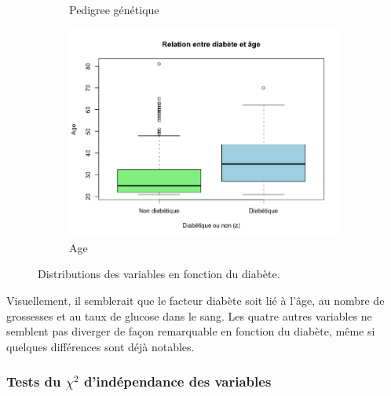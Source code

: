 \documentclass[a4paper,10pt]{report}
\begin{document}
\begin{figure}[H]
\begin{subfigure}[b]{0.25\linewidth}
		\caption{\scriptsize Pedigree génétique}
		\label{fig:1-3-2-boxplot-diabete-pedigree}
	\end{subfigure}%
	\begin{subfigure}[b]{0.25\linewidth}
		\centering
		\captionsetup{justification=centering}
		\includegraphics[width=1\linewidth]{img/1-3-2-boxplot-diabete-age}
		\caption{\scriptsize Age}
		\label{fig:1-3-2-boxplot-diabete-age}
	\end{subfigure}%
	\caption{
		\small Distributions des variables en fonction du diabète.
	}
	\label{fig:box_plot_diabete_pima}%
\end{figure}




Visuellement, il semblerait que le facteur diabète soit lié à l'âge, au nombre de grossesses et au taux de glucose dans le sang. Les quatre autres variables ne semblent pas diverger de façon remarquable en fonction du diabète, même si quelques différences sont déjà notables.



\subsubsection{Tests du $\chi^2$ d'indépendance des variables}
\end{document}
